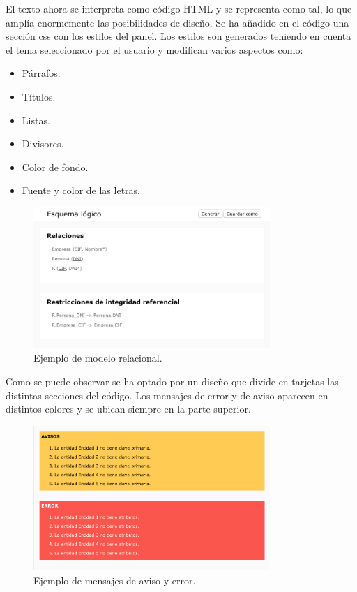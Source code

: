 \begin{itemize}
   El texto ahora se interpreta como código HTML y se representa como tal, lo que amplía enormemente las posibilidades de diseño. Se ha añadido en el código una sección css con los estilos del panel. Los estilos son generados teniendo en cuenta el tema seleccionado por el usuario y modifican varios aspectos como:
   \begin{itemize}
       \item Párrafos.
       \item Títulos.
       \item Listas.
       \item Divisores.
       \item Color de fondo.
       \item Fuente y color de las letras.
   \end{itemize}
   \begin{figure}[H]
            \centering
            \includegraphics[width=0.8\textwidth]{img/ejemploreport.png}
            \caption{Ejemplo de modelo relacional.}
    \end{figure}
    Como se puede observar se ha optado por un diseño que divide en tarjetas las distintas secciones del código. Los mensajes de error y de aviso aparecen en distintos colores y se ubican siempre en la parte superior.
    \begin{figure}[H]
            \centering
            \includegraphics[width=0.8\textwidth]{img/ejemploreport2.png}
            \caption{Ejemplo de mensajes de aviso y error.}
    \end{figure}
\end{itemize}
